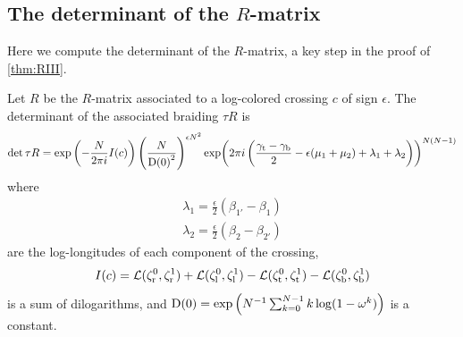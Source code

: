 \documentclass{sl2ams}
\numberwithin{equation}{section}
\begin{document}
\subsection{The determinant of the \texorpdfstring{\(R\)}{R}-matrix}
Here we compute the determinant of the \(R\)-matrix, a key step in the proof of \cref{thm:RIII}.
\begin{lemma}
  \label{thm:R-mat-det}
  Let \(R\) be the \(R\)-matrix associated to a log-colored crossing \(c\) of sign \(\epsilon\).
  The determinant of the associated braiding \(\tau R\) is 
  \begin{align*}
    \det \tau R
    =
    \exp\left(-\frac{\nr}{2\pi i} I(c)\right)
    \left(
      \frac{N}{\df{0}^2}
    \right)^{\epsilon \nr^2}
    \exp\leftfun(
      2\pi i\left( \frac{\gamma_{\lW} - \gamma_{\lE}}{2} - \epsilon(\mu_{1} + \mu_{2}) + \lambda_{1} + \lambda_{2} \right)
    \rightfun)^{\nr (\nr-1)}
  \end{align*}
  where 
  \begin{align*}
    \lambda_{1} = \frac{\epsilon}{2}(\beta_{1'} - \beta_{1})
    \\
    \lambda_{2} = \frac{\epsilon}{2}(\beta_{2} - \beta_{2'})
  \end{align*}
  are the log-longitudes of each component of the crossing,
  \[
    I(c) =
      \mathcal{L}(\zeta^0_{\mathrm{r}}, \zeta^1_{\mathrm{r}})
      +
      \mathcal{L}(\zeta^0_{\mathrm{l}}, \zeta^1_{\mathrm{l}})
      -
      \mathcal{L}(\zeta^0_{\mathrm{t}}, \zeta^1_{\mathrm{t}})
      -
      \mathcal{L}(\zeta^0_{\mathrm{b}}, \zeta^1_{\mathrm{b}})
  \]
  is a sum of dilogarithms, and \(\df{0} = \exp\left( \nr^{-1} \sum_{k=0}^{\nr-1} k \log(1 - \omega^{k}) \right)\) is a constant.
\end{lemma}
\end{document}
